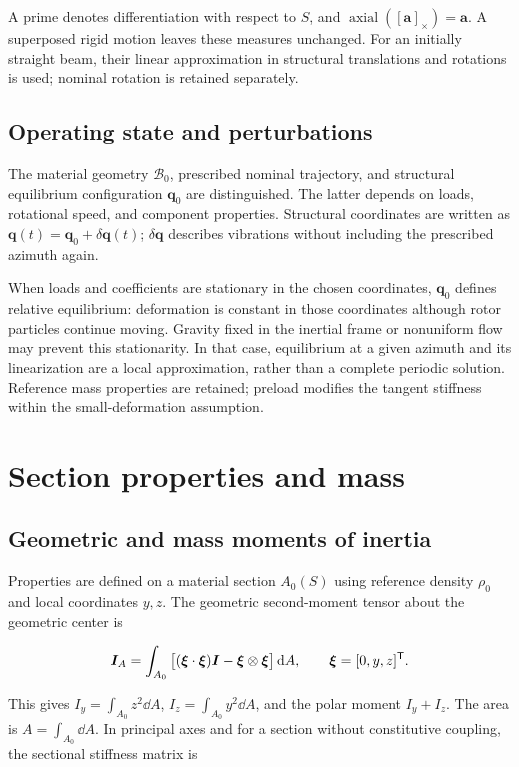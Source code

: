A prime denotes differentiation with respect to $S$, and $\operatorname{axial}([\bm a]_\times)=\bm a$. A superposed rigid motion leaves these measures unchanged. For an initially straight beam, their linear approximation in structural translations and rotations is used; nominal rotation is retained separately.

\subsection{Operating state and perturbations}
The material geometry $\mathcal B_0$, prescribed nominal trajectory, and structural equilibrium configuration $\bm q_0$ are distinguished. The latter depends on loads, rotational speed, and component properties. Structural coordinates are written as $\bm q(t)=\bm q_0+\delta\bm q(t)$; $\delta\bm q$ describes vibrations without including the prescribed azimuth again.

When loads and coefficients are stationary in the chosen coordinates, $\bm q_0$ defines relative equilibrium: deformation is constant in those coordinates although rotor particles continue moving. Gravity fixed in the inertial frame or nonuniform flow may prevent this stationarity. In that case, equilibrium at a given azimuth and its linearization are a local approximation, rather than a complete periodic solution. Reference mass properties are retained; preload modifies the tangent stiffness within the small-deformation assumption.

\FloatBarrier
\section{Section properties and mass}
\subsection{Geometric and mass moments of inertia}
Properties are defined on a material section $A_0(S)$ using reference density $\rho_0$ and local coordinates $y,z$. The geometric second-moment tensor about the geometric center is

\begin{equation}
\bm I_A=\int_{A_0}
\big[(\bm\xi\cdot\bm\xi)\bm I-\bm\xi\otimes\bm\xi\big]\,\mathrm d A,
\qquad \bm\xi=[0,y,z]^\mathsf T.
\end{equation}

This gives $I_y=\int_{A_0}z^2\dd A$, $I_z=\int_{A_0}y^2\dd A$, and the polar moment $I_y+I_z$. The area is $A=\int_{A_0}\dd A$. In principal axes and for a section without constitutive coupling, the sectional stiffness matrix is


